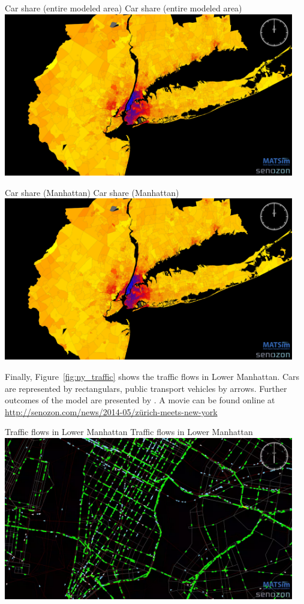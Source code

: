 \createfigure%
{Car share (entire modeled area)}%
{Car share (entire modeled area)}%
{\label{fig:ny_car_share_full}}%
{\includegraphics[width=0.95\textwidth, angle=0]{./using/figures/ny_carshare_TAZ_full.png}}%
{}

\createfigure%
{Car share (Manhattan)}%
{Car share (Manhattan)}%
{\label{fig:ny_car_share_gross}}%
{\includegraphics[width=0.95\textwidth, angle=0]{./using/figures/ny_carshare_TAZ_full.png}}%
{}

Finally, Figure~\ref{fig:ny_traffic} shows the traffic flows in Lower Manhattan. Cars are represented by rectangulars, public transport vehicles by arrows. Further outcomes of the model are presented by \citet[][]{Balmer_unpub_ZMNY_2014}. A movie can be found online at \url{http://senozon.com/news/2014-05/zürich-meets-new-york}

\createfigure%
{Traffic flows in Lower Manhattan}%
{Traffic flows in Lower Manhattan}%
{\label{fig:ny_traffic}}%
{\includegraphics[width=0.95\textwidth, angle=0]{./using/figures/ny_traffic.png}}%
{}

